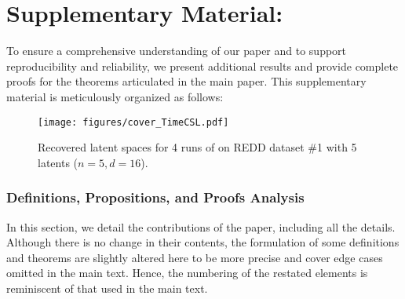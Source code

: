 \documentclass{article} %
\theoremstyle{plain}
\theoremstyle{definition}
\theoremstyle{remark}
\numberwithin{equation}{section}
\begin{document}
% 
% 
% 
% 
% 
% 
% 



\appendix
\newpage
\vspace{-1cm}
\part{\Large Supplementary Material:  } %
To ensure a comprehensive understanding of our paper and to support reproducibility and reliability, we present additional results and provide complete proofs for the theorems articulated in the main paper. This supplementary material is meticulously organized as follows:
\parttoc %

\begin{figure}[H]
    \centering
    \vspace{-0.30cm}
    \texttt{[image: figures/cover\_TimeCSL.pdf]}
    \vspace{-1cm}
    \caption{Recovered latent spaces for 4 runs of \TimeCSL on REDD dataset \#1 with 5 latents ($n=5, d=16$).}
    \vspace{-0.5cm}
\end{figure}

\section{Definitions, Propositions, and Proofs Analysis}\label{app:app_def_theorems_proofs}
In this section, we detail the contributions of the paper, including all the details. Although there is no change in their contents, the formulation of some definitions and theorems are slightly altered here to be more precise and cover edge cases omitted in the main text. Hence, the numbering of the restated elements is reminiscent of that used in the main text.
\end{document}

